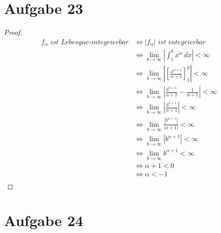 \documentclass[10pt,a4paper]{article}
\begin{document}
\section{Aufgabe 23}
\begin{proof}
  \begin{align*}
    f_{\alpha}\textit{ ist Lebesgue-integrierbar} & \Leftrightarrow |f_{\alpha}| \textit{ ist integrierbar}\\
    & \Leftrightarrow \lim_{b \rightarrow \infty} |\int_{1}^{b} x^{\alpha}\ dx| < \infty\\
    & \Leftrightarrow \lim_{b \rightarrow \infty} |\left[ \frac{x^{\alpha + 1}}{\alpha + 1} \right]_{1}^{b}| < \infty\\
    & \Leftrightarrow \lim_{b \rightarrow \infty} |\frac{b^{\alpha + 1}}{\alpha + 1} - \frac{1}{\alpha + 1}| < \infty\\
    & \Leftrightarrow \lim_{b \rightarrow \infty} |\frac{b^{\alpha + 1}}{\alpha + 1}| < \infty\\
    & \Leftrightarrow \lim_{b \rightarrow \infty} \frac{|b^{\alpha + 1}|}{|\alpha + 1|} < \infty\\
    & \Leftrightarrow \lim_{b \rightarrow \infty} |b^{\alpha + 1}| < \infty\\
    & \Leftrightarrow \lim_{b \rightarrow \infty} b^{\alpha + 1} < \infty\\
    & \Leftrightarrow \alpha + 1 < 0\\
    & \Leftrightarrow \alpha < -1\\
  \end{align*}
\end{proof}

\section{Aufgabe 24}
\end{document}
